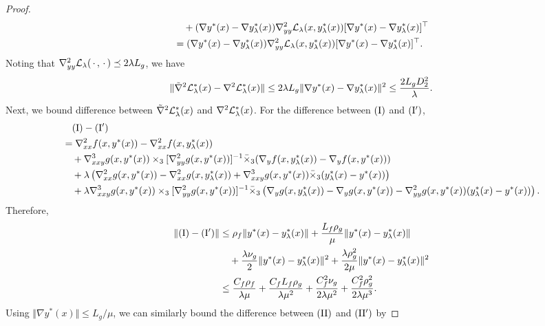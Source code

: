 \begin{proof}
\begin{align*}
    &\quad + (\nabla y^*(x) - \nabla y_{\lambda}^*(x)) \nabla_{yy}^2 {\mathcal{L}}_{\lambda} (x,y_{\lambda}^*(x)) [ \nabla y^*(x) - \nabla y_{\lambda}^*(x)]^\top \\
    &= (\nabla y^*(x) - \nabla y_{\lambda}^*(x)) \nabla_{yy}^2 {\mathcal{L}}_{\lambda} (x,y_{\lambda}^*(x)) [ \nabla y^*(x) - \nabla y_{\lambda}^*(x)]^\top.
\end{align*}
Noting that $ \nabla_{yy}^2 {\mathcal{L}}_{\lambda}(\,\cdot\, , \,\cdot\,) \preceq 2 \lambda L_g$, we have
\begin{align*}
    \Vert \tilde \nabla^2 {\mathcal{L}}_{\lambda}^*(x) - \nabla^2 {\mathcal{L}}_{\lambda}^*(x) \Vert \le 2 \lambda L_g \Vert \nabla y^*(x) - \nabla y_{\lambda}^*(x) \Vert^2 \le \frac{2L_g D_2^2}{\lambda }. 
\end{align*}
Next, we bound difference between 
$\tilde \nabla^2 {\mathcal{L}}_{\lambda}^*(x) $ and $\nabla^2 {\mathcal{L}}_{\lambda}^*(x)$. For the difference between ${\rm (I)}$ and ${\rm (I')}$, 
{\small \begin{align*}
    &\quad \rm (I) - {\rm (I')} \\
    &= \nabla_{xx}^2 f(x,y^*(x)) - \nabla_{xx}^2 f(x,y_{\lambda}^*(x))  \\
    & \quad + \nabla_{xxy}^3 g(x,y^*(x)) \times_3 [\nabla_{yy}^2 g(x,y^*(x))]^{-1} \bar \times_3 ( \nabla_y f(x,y_{\lambda}^*(x)) - \nabla_y f(x,y^*(x))) \\
    &\quad + \lambda \left( \nabla_{xx}^2 g(x,y^*(x)) -  \nabla_{xx}^2 g(x,y_{\lambda}^*(x))  + \nabla_{xxy}^3  g(x,y^*(x)) \bar \times_3
    (y_{\lambda}^*(x) - y^*(x)) \right) \\
    &\quad + \lambda \nabla_{xxy}^3 g(x,y^*(x)) \times_3 [\nabla_{yy}^2 g(x,y^*(x))]^{-1} \bar \times_3 \left(\nabla_y g(x,y_{\lambda}^*(x)) 
    - \nabla_y g(x,y^*(x)) - \nabla_{yy}^2 g(x,y^*(x)) (y_{\lambda}^*(x) -y^*(x))  \right).
\end{align*}}
Therefore, 
\begin{align*}
    \Vert {\rm (I) } - {\rm (I')} \Vert &\le \rho_f \Vert y^*(x) - y_{\lambda}^*(x) \Vert  + \frac{L_f \rho_g}{\mu} \Vert y^*(x) - y_{\lambda}^*(x) \Vert \\
    &\quad + \frac{\lambda \nu_g}{2} \Vert y^*(x) - y_{\lambda}^*(x) \Vert^2 + \frac{\lambda \rho_g^2}{2\mu} \Vert y^*(x) - y_{\lambda}^*(x) \Vert^2  \\
    &\le \frac{C_f \rho_f}{\lambda \mu} + \frac{C_f L_f \rho_g}{\lambda \mu^2} +  \frac{C_f^2 \nu_g}{2\lambda \mu^2}+ \frac{C_f^2 \rho_g^2}{2 \lambda \mu^3} .
\end{align*}
Using $\Vert \nabla y^*(x) \Vert \le  L_g / \mu$, we can similarly bound the difference between ${\rm (II)}$ and ${\rm (II')}$ by

\end{proof}
